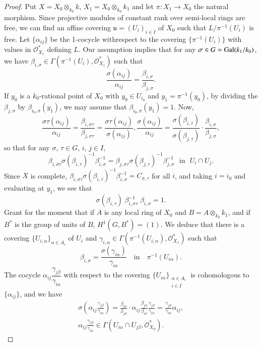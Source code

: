 \begin{proof}
Put $X = X_0 \otimes_{k_0} k$, $X_1 = X_0 \otimes_{k_0} k_1$ and let $\pi : X_1 \to X_0$ the natural morphism. Since projective modules of constant rank over semi-local rings are free, we can find an affine covering $\mathfrak{u} = (U_i)_{i \in I}$ of $X_0$ such that $L/\pi^{-1} (U_i)$ is free. Let $\{\alpha_{ij}\}$ be the 1-cocycle with\pageoriginale respect to the covering $\{\pi^{-1} (U_i)\}$ with values in $\mathcal{O}^*_{X_1}$ defining $L$. Our assumption implies that for any $\sigma \in G = \operatorname{Gal} (k_1/ k_0)$, we have $\beta_{i,\sigma} \in \Gamma (\pi^{-1} (U_i), \mathcal{O}^*_{X_1})$ such that 
$$
\frac{\sigma (\alpha_{ij})}{\alpha_{ij}} = \frac{\beta_{i, \sigma}}{\beta_{j, \sigma}}.
$$
If $y_0$ is a $k_0$-rational point of $X_0$ with $y_0 \in U_{i_0}$ and $y_1 = \pi^{-1} (y_0)$, by dividing the $\beta_{j,\sigma}$ by $\beta_{i_0,\sigma } (y_1)$, we may assume that $\beta_{i_0, \sigma} (y_1) = 1$. Now, 
$$
\frac{\sigma \tau (\alpha_{ij})}{\alpha_{ij}} = \dfrac{\beta_{i, \sigma \tau}}{\beta_{j, \sigma \tau}} = \frac{\sigma \tau (\alpha_{ij})}{\sigma(\alpha_{ij})}, \frac{\sigma (\alpha_{ij})}{\alpha_{ij}} = \frac{\sigma(\beta_{i,\tau})}{\sigma (\beta_{j,\tau})} \cdot \frac{\beta_{i,\sigma}}{\beta_{j,\sigma}},
$$
so that for any $\sigma$, $\tau \in G$, $i$, $j \in I$,
$$
\beta_{i, \sigma \tau} \sigma (\beta_{i,\tau})^{-1} \beta^{-1}_{i,\sigma} = \beta_{j, \sigma \tau} \sigma (\beta_{j,\tau})^{-1} \beta^{-1}_{j,\sigma} \text{~ in ~} U_i \cap U_j.
$$
Since $X$ is complete, $\beta_{i,\sigma \tau} \sigma (\beta_{i,\tau})^{-1} \beta^{-1}_{i,\sigma} = C_{\sigma, \tau}$ for all $i$, and taking $i = i_0$ and evaluating at $y_1$, we see that 
$$
\sigma (\beta_{i,\tau}) \; \beta^{-1}_{i, \sigma\tau} \; \beta_{i,\sigma} = 1.
$$
Grant for the moment that if $A$ is any local ring of $X_0$ and $B = A \otimes_{k_0} k_1 $, and if $B^*$ is the group of units of $B$, $H^1 (G, B^*) = (1)$. We deduce that there is a covering $\{U_{i,\alpha}\}_{\alpha \in A_i}$ of $U_i$ and $\gamma_{i,\alpha} \in \Gamma (\pi^{-1} (U_{i,\alpha}), \mathcal{O}^*_{X_1})$ such that 
$$
\beta_{i, \sigma} = \frac{\sigma (\gamma_{i\alpha})}{\gamma_{i\alpha}} \text{ ~ in ~ } \pi^{-1} (U_{i\alpha}).
$$
The cocycle $\alpha_{ij} \dfrac{\gamma_{j\beta}}{\gamma_{i\alpha}}$ with respect to the covering $\{U_{i\alpha}\}_{\substack{\alpha \in A_i \\ i \in I}}$ is cohomologous to $\{\alpha_{ij}\}$, and we have
\begin{gather*}
\sigma \left(\alpha_{ij} \frac{\gamma_{j \beta}}{\gamma_{i\alpha}} \right) = \frac{\beta_{i\sigma}}{\beta_{j\sigma}} \cdot  \alpha_{ij} \frac{\beta_{j\sigma}}{\beta_{i \sigma}} \frac{\gamma_{j\beta}}{\gamma_{i\alpha}} = \frac{\gamma_{j\beta}}{\gamma_{i\alpha}} \alpha_{ij},\\
\alpha_{ij} \frac{\gamma_{j\beta}}{\gamma_{i\alpha}} \in \Gamma (U_{i\alpha} \cap U_{j\beta}, \mathcal{O}^*_{X_0}).
\end{gather*}


\end{proof}
